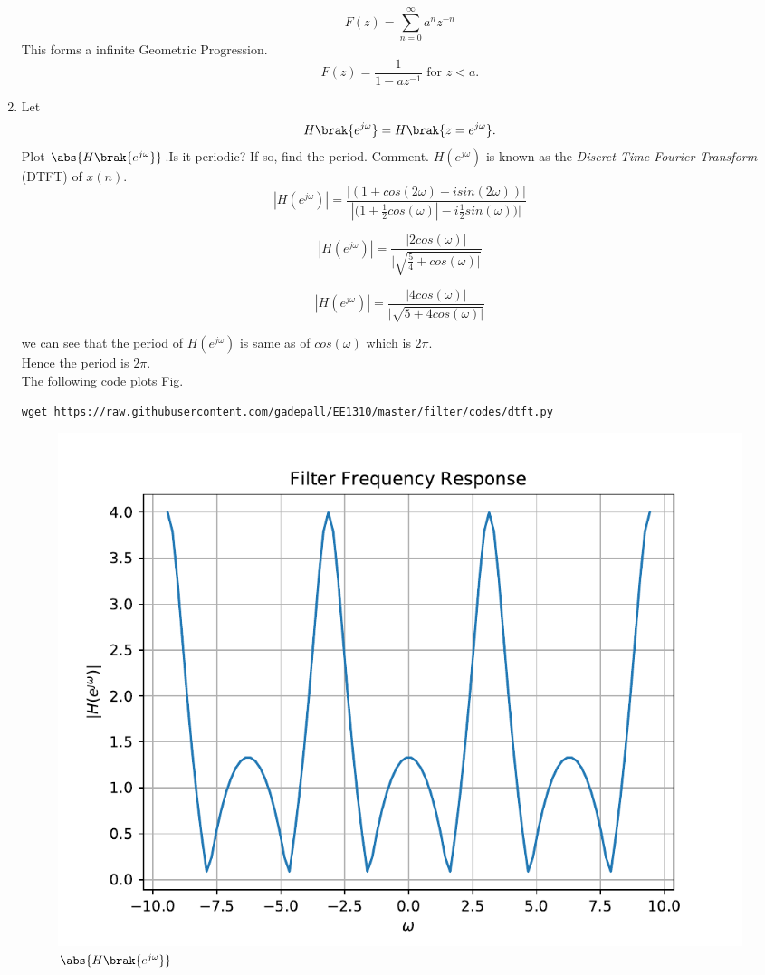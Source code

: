 \documentclass[journal,12pt,twocolumn]{IEEEtran}
\renewcommand\thesection{\arabic{section}}
\begin{document}
\begin{enumerate}[label=\thesection.\arabic*]
\begin{equation}
    F(z) = \sum_{n=0}^{\infty} a^{n}z^{-n}
\end{equation}
This forms a infinite Geometric Progression.
\begin{equation}
    F(z) = \frac{1}{1-az^{-1}} \text{ for } z<a.
\end{equation}
\item 
Let
\begin{equation}
H\brak{e^{j \omega}} = H\brak{z = e^{j \omega}}.
\end{equation}
Plot $\abs{H\brak{e^{j \omega}}}$.Is it periodic? If so, find the period. Comment.  $H(e^{j \omega})$ is
known as the {\em Discret Time Fourier Transform} (DTFT) of $x(n)$.
\\
\solution 
\begin{equation}
    |H(e^{j \omega})| = \frac{|(1+cos(2\omega)- i sin(2 \omega))|}{|(1+\frac{1}{2}cos(\omega)|- i\frac{1}{2}sin(\omega))|}
\end{equation}

\begin{equation}
    |H(e^{j \omega})| = \frac{|2cos(\omega)|}{|\sqrt{\frac{5}{4} + cos(\omega)|}}
\end{equation}

\begin{equation}
    |H(e^{j \omega})| = \frac{|4cos(\omega)|}{|\sqrt{5+ 4cos(\omega)|}}
\end{equation}

we can see that the period of $H(e^{j \omega})$ is same as of $cos(\omega)$ which is $2\pi$. \\
Hence the period is $2\pi$.\\
The following code plots Fig.
\begin{lstlisting}
wget https://raw.githubusercontent.com/gadepall/EE1310/master/filter/codes/dtft.py
\end{lstlisting}
\begin{figure}[!ht]
\centering
\includegraphics[width=\columnwidth]{./figs/dtft}
\caption{$\abs{H\brak{e^{j\omega}}}$}
\label{fig:dtft}
\end{figure}


\end{enumerate}
\end{document}
